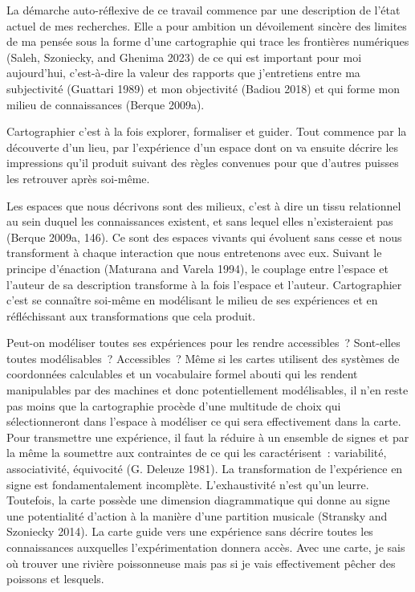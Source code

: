 \documentclass[
  letterpaper,
  DIV=11,
  numbers=noendperiod]{scrreprt}
\begin{document}
La démarche auto-réflexive de ce travail commence par une description de
l'état actuel de mes recherches. Elle a pour ambition un dévoilement
sincère des limites de ma pensée sous la forme d'une cartographie qui
trace les frontières numériques (Saleh, Szoniecky, and Ghenima 2023) de
ce qui est important pour moi aujourd'hui, c'est-à-dire la valeur des
rapports que j'entretiens entre ma subjectivité (Guattari 1989) et mon
objectivité (Badiou 2018) et qui forme mon milieu de connaissances
(Berque 2009a).

Cartographier c'est à la fois explorer, formaliser et guider. Tout
commence par la découverte d'un lieu, par l'expérience d'un espace dont
on va ensuite décrire les impressions qu'il produit suivant des règles
convenues pour que d'autres puisses les retrouver après soi-même.

Les espaces que nous décrivons sont des milieux, c'est à dire un tissu
relationnel au sein duquel les connaissances existent, et sans lequel
elles n'existeraient pas (Berque 2009a, 146). Ce sont des espaces
vivants qui évoluent sans cesse et nous transforment à chaque
interaction que nous entretenons avec eux. Suivant le principe
d'énaction (Maturana and Varela 1994), le couplage entre l'espace et
l'auteur de sa description transforme à la fois l'espace et l'auteur.
Cartographier c'est se connaître soi-même en modélisant le milieu de ses
expériences et en réfléchissant aux transformations que cela produit.

Peut-on modéliser toutes ses expériences pour les rendre accessibles~?
Sont-elles toutes modélisables~? Accessibles~? Même si les cartes
utilisent des systèmes de coordonnées calculables et un vocabulaire
formel abouti qui les rendent manipulables par des machines et donc
potentiellement modélisables, il n'en reste pas moins que la
cartographie procède d'une multitude de choix qui sélectionneront dans
l'espace à modéliser ce qui sera effectivement dans la carte. Pour
transmettre une expérience, il faut la réduire à un ensemble de signes
et par la même la soumettre aux contraintes de ce qui les
caractérisent~: variabilité, associativité, équivocité (G. Deleuze
1981). La transformation de l'expérience en signe est fondamentalement
incomplète. L'exhaustivité n'est qu'un leurre. Toutefois, la carte
possède une dimension diagrammatique qui donne au signe une potentialité
d'action à la manière d'une partition musicale (Stransky and Szoniecky
2014). La carte guide vers une expérience sans décrire toutes les
connaissances auxquelles l'expérimentation donnera accès. Avec une
carte, je sais où trouver une rivière poissonneuse mais pas si je vais
effectivement pêcher des poissons et lesquels.
\end{document}
